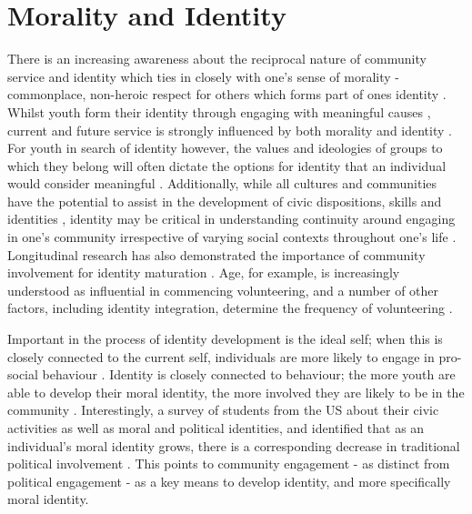 




\section{Morality and Identity} 
There is an increasing awareness about the reciprocal nature of community service and identity which ties in closely with one's sense of morality - commonplace, non-heroic respect for others which forms part of ones identity \citep{Youniss1999a}. Whilst youth form their identity through engaging with meaningful causes \citep{Youniss1997}, current and future service is strongly influenced by both morality and identity \citep{VanGoethem2012}. For youth in search of identity however, the values and ideologies of groups to which they belong will often dictate the options for identity that an individual would consider meaningful \citep{Phinney2011,Flanagan2011a}. Additionally, while all cultures and communities have the potential to assist in the development of civic dispositions, skills and identities \citep{Flanagan2011a}, identity may be critical in understanding continuity around engaging in one's community irrespective of varying social contexts throughout one's life \citep{Youniss1997}. Longitudinal research has also demonstrated the importance of community involvement for identity maturation \citep{Hardy2011}. Age, for example, is increasingly understood as influential in commencing volunteering, and a number of other factors, including identity integration, determine the frequency of volunteering \citep{VanGoethem2012}.

Important in the process of identity development is the ideal self; when this is closely connected to the current self, individuals are more likely to engage in pro-social behaviour \citep{Hart1995}. Identity is closely connected to behaviour; the more youth are able to develop their moral identity, the more involved they are likely to be in the community \citep{Porter2013}. Interestingly, a survey of students from the US about their civic activities as well as moral and political identities, and identified that as an individual's moral identity grows, there is a corresponding decrease in traditional political involvement \citep{Porter2013}. This points to community engagement - as distinct from political engagement - as a key means to develop identity, and more specifically moral identity.



